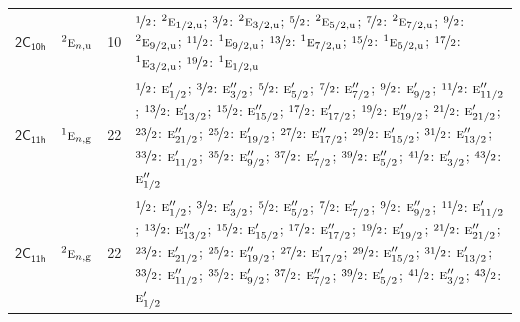 \documentclass[10pt,a4paper]{article}
\numberwithin{equation}{section}
\newcommand{\grp}[1]{\mathsf{#1}}
\newcommand{\irr}[1]{\text{\normalfont\scshape #1}}
\newcommand{\conjpair}[1]{{}^{#1}}
\newcommand{\ptag}[1]{\mathrm{#1}}
\newlength{\fillwidth}\newlength{\cellwidth}\newlength{\colwidth}
\begin{document}
{\begin{longtable}{@{}llr>{\RaggedRight\arraybackslash}p{\fillwidth}@{}}
\href{2C10h.pdf}{$\grp{2C_{10h}}$} & $\conjpair{2}\irr{e}_{n,\ptag{u}}$ & 10 & $\nicefrac{1}{2}$: $\conjpair{2}\irr{e}_{1/2,\ptag{u}}$; $\nicefrac{3}{2}$: $\conjpair{2}\irr{e}_{3/2,\ptag{u}}$; $\nicefrac{5}{2}$: $\conjpair{2}\irr{e}_{5/2,\ptag{u}}$; $\nicefrac{7}{2}$: $\conjpair{2}\irr{e}_{7/2,\ptag{u}}$; $\nicefrac{9}{2}$: $\conjpair{2}\irr{e}_{9/2,\ptag{u}}$; $\nicefrac{11}{2}$: $\conjpair{1}\irr{e}_{9/2,\ptag{u}}$; $\nicefrac{13}{2}$: $\conjpair{1}\irr{e}_{7/2,\ptag{u}}$; $\nicefrac{15}{2}$: $\conjpair{1}\irr{e}_{5/2,\ptag{u}}$; $\nicefrac{17}{2}$: $\conjpair{1}\irr{e}_{3/2,\ptag{u}}$; $\nicefrac{19}{2}$: $\conjpair{1}\irr{e}_{1/2,\ptag{u}}$\\
\href{2C11h.pdf}{$\grp{2C_{11h}}$} & $\conjpair{1}\irr{e}_{n,\ptag{g}}$ & 22 & $\nicefrac{1}{2}$: $\irr{e}_{1/2}'$; $\nicefrac{3}{2}$: $\irr{e}_{3/2}''$; $\nicefrac{5}{2}$: $\irr{e}_{5/2}'$; $\nicefrac{7}{2}$: $\irr{e}_{7/2}''$; $\nicefrac{9}{2}$: $\irr{e}_{9/2}'$; $\nicefrac{11}{2}$: $\irr{e}_{11/2}''$; $\nicefrac{13}{2}$: $\irr{e}_{13/2}'$; $\nicefrac{15}{2}$: $\irr{e}_{15/2}''$; $\nicefrac{17}{2}$: $\irr{e}_{17/2}'$; $\nicefrac{19}{2}$: $\irr{e}_{19/2}''$; $\nicefrac{21}{2}$: $\irr{e}_{21/2}'$; $\nicefrac{23}{2}$: $\irr{e}_{21/2}''$; $\nicefrac{25}{2}$: $\irr{e}_{19/2}'$; $\nicefrac{27}{2}$: $\irr{e}_{17/2}''$; $\nicefrac{29}{2}$: $\irr{e}_{15/2}'$; $\nicefrac{31}{2}$: $\irr{e}_{13/2}''$; $\nicefrac{33}{2}$: $\irr{e}_{11/2}'$; $\nicefrac{35}{2}$: $\irr{e}_{9/2}''$; $\nicefrac{37}{2}$: $\irr{e}_{7/2}'$; $\nicefrac{39}{2}$: $\irr{e}_{5/2}''$; $\nicefrac{41}{2}$: $\irr{e}_{3/2}'$; $\nicefrac{43}{2}$: $\irr{e}_{1/2}''$\\
\href{2C11h.pdf}{$\grp{2C_{11h}}$} & $\conjpair{2}\irr{e}_{n,\ptag{g}}$ & 22 & $\nicefrac{1}{2}$: $\irr{e}_{1/2}''$; $\nicefrac{3}{2}$: $\irr{e}_{3/2}'$; $\nicefrac{5}{2}$: $\irr{e}_{5/2}''$; $\nicefrac{7}{2}$: $\irr{e}_{7/2}'$; $\nicefrac{9}{2}$: $\irr{e}_{9/2}''$; $\nicefrac{11}{2}$: $\irr{e}_{11/2}'$; $\nicefrac{13}{2}$: $\irr{e}_{13/2}''$; $\nicefrac{15}{2}$: $\irr{e}_{15/2}'$; $\nicefrac{17}{2}$: $\irr{e}_{17/2}''$; $\nicefrac{19}{2}$: $\irr{e}_{19/2}'$; $\nicefrac{21}{2}$: $\irr{e}_{21/2}''$; $\nicefrac{23}{2}$: $\irr{e}_{21/2}'$; $\nicefrac{25}{2}$: $\irr{e}_{19/2}''$; $\nicefrac{27}{2}$: $\irr{e}_{17/2}'$; $\nicefrac{29}{2}$: $\irr{e}_{15/2}''$; $\nicefrac{31}{2}$: $\irr{e}_{13/2}'$; $\nicefrac{33}{2}$: $\irr{e}_{11/2}''$; $\nicefrac{35}{2}$: $\irr{e}_{9/2}'$; $\nicefrac{37}{2}$: $\irr{e}_{7/2}''$; $\nicefrac{39}{2}$: $\irr{e}_{5/2}'$; $\nicefrac{41}{2}$: $\irr{e}_{3/2}''$; $\nicefrac{43}{2}$: $\irr{e}_{1/2}'$\\

\end{longtable}}
\end{document}
